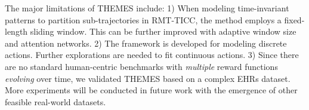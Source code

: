\documentclass{article}
\begin{document}
The major limitations of THEMES include: 1) When modeling time-invariant patterns to partition sub-trajectories in RMT-TICC, the method employs a fixed-length sliding window. This can be further improved with adaptive window size and attention networks. 2) The framework is developed for modeling discrete actions. Further explorations are needed to fit continuous actions. 3) Since there are no standard human-centric benchmarks with \emph{multiple} reward functions \emph{evolving} over time, we validated THEMES based on a complex EHRs dataset. More experiments will be conducted in future work with the emergence of other feasible real-world datasets. 






\end{document}
